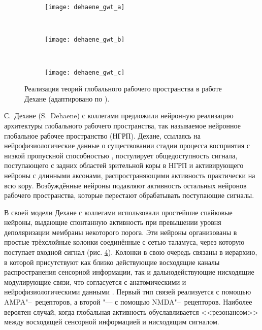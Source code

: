 \begin{figure}[h]
	\centering
	\begin{subfigure}[b]{0.3\textwidth}
		\texttt{[image: dehaene\_gwt\_a]}
		\caption{}
		\label{fg:dehaene_gwt_a}
	\end{subfigure}
	~ 
	\begin{subfigure}[b]{0.3\textwidth}
		\texttt{[image: dehaene\_gwt\_b]}
		\caption{}
		\label{fg:dehaene_gwt_b}
	\end{subfigure}
	~ 
	\begin{subfigure}[b]{0.3\textwidth}
		\texttt{[image: dehaene\_gwt\_c]}
		\caption{}
		\label{fg:dehaene_gwt_c}
	\end{subfigure}
	\caption{Реализация теорий глобального рабочего пространства в работе Дехане (адаптировано по \cite{Dehaene2003}).}
	\label{fg:dehaene_gwt}
\end{figure}

С.~Дехане (S.~Dehaene) с коллегами \cite{Dehaene2003} предложили нейронную реализацию архитектуры глобального рабочего пространства, так называемое нейронное глобальное рабочее пространство (НГРП). Дехане, ссылаясь на нейрофизиологические данные о существовании стадии процесса восприятия с низкой пропускной способностью \cite{Chun1995}, постулирует общедоступность сигнала, поступающего с задних областей зрительной коры в НГРП и активирующего нейроны с длинными аксонами, распространяющими активность практически на всю кору. Возбуждённые нейроны подавляют активность остальных нейронов рабочего пространства, которые перестают обрабатывать поступающие сигналы. 

В своей модели Дехане с коллегами использовали простейшие спайковые нейроны, выдающие спонтанную активность при превышении уровня деполяризации мембраны некоторого порога. Эти нейроны организованы в простые трёхслойные колонки соединённые с сетью таламуса, через которую поступает входной сигнал (рис. \ref{fg:dehaene_gwt}). Колонки в свою очередь связаны в иерархию, в которой присутствуют как близко действующие восходящие каналы распространения сенсорной информации, так и дальнодействующие нисходящие модулирующие связи, что согласуется с анатомическими и нейрофизиологическими данными \cite{Lamme2000,Felleman1991}. Первый тип связей реализуется с помощью AMPA"--~рецепторов, а второй "--- с помощью NMDA"--~рецепторов. Наиболее вероятен случай, когда глобальная активность обуславливается <<резонансом>> \cite{Llinas1998} между восходящей сенсорной информацией и нисходящим сигналом.

